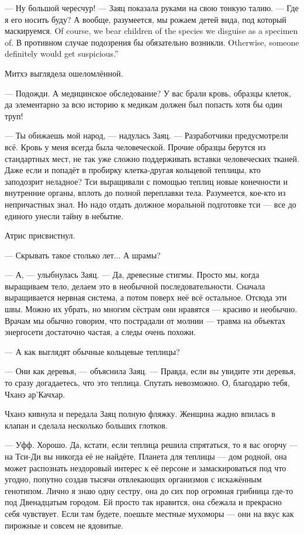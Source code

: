 --- Ну большой чересчур! --- Заяц показала руками на свою тонкую талию.
--- Где я его носить буду?
{А вообще, разумеется, мы рожаем детей вида, под который маскируемся.}
{Of course, we bear children of the species we disguise as a specimen of.}
{В противном случае подозрения бы обязательно возникли.}
{Otherwise, someone definitely would get suspicious.''}

Митхэ выглядела ошеломлённой.

--- Подожди.
А медицинское обследование?
У вас брали кровь, образцы клеток, да элементарно за всю историю к медикам должен был попасть хотя бы один труп!

--- Ты обижаешь мой народ, --- надулась Заяц.
--- Разработчики предусмотрели всё.
Кровь у меня всегда была человеческой.
Прочие образцы берутся из стандартных мест, не так уже сложно поддерживать вставки человеческих тканей.
Даже если и попадёт в пробирку клетка-другая кольцевой теплицы, кто заподозрит неладное?
Тси выращивали с помощью теплиц новые конечности и внутренние органы, вплоть до полной переплавки тела.
Разумеется, кое-кто из непричастных знал.
Но надо отдать должное моральной подготовке тси --- все до единого унесли тайну в небытие.

Атрис присвистнул.

--- Скрывать такое столько лет...
А шрамы?

--- А, --- улыбнулась Заяц.
--- Да, древесные стигмы.
Просто мы, когда выращиваем тело, делаем это в необычной последовательности.
Сначала выращивается нервная система, а потом поверх неё всё остальное.
Отсюда эти швы.
Можно их убрать, но многим сёстрам они нравятся --- красиво и необычно.
Врачам мы обычно говорим, что пострадали от молнии --- травма на объектах энергосети достаточно частая, а следы очень похожи.

--- А как выглядят обычные кольцевые теплицы?

--- Они как деревья, --- объяснила Заяц.
--- Правда, если вы увидите эти деревья, то сразу догадаетесь, что это теплица.
Спутать невозможно.
О, благодарю тебя, Чханэ ар’Качхар.

Чханэ кивнула и передала Заяц полную фляжку.
Женщина жадно впилась в клапан и сделала несколько больших глотков.

--- Уфф.
Хорошо.
Да, кстати, если теплица решила спрятаться, то я вас огорчу --- на Тси-Ди вы никогда её не найдёте.
Планета для теплицы --- дом родной, она может распознать нездоровый интерес к её персоне и замаскироваться под что угодно, попутно создав тысячи отвлекающих организмов с искажённым генотипом.
Лично я знаю одну сестру, она до сих пор огромная грибница где-то под Двенадцатым городом.
Ей просто так нравится, она сбежала и прекрасно себя чувствует.
Если там будете, поешьте местные мухоморы --- они на вкус как пирожные и совсем не ядовитые.

